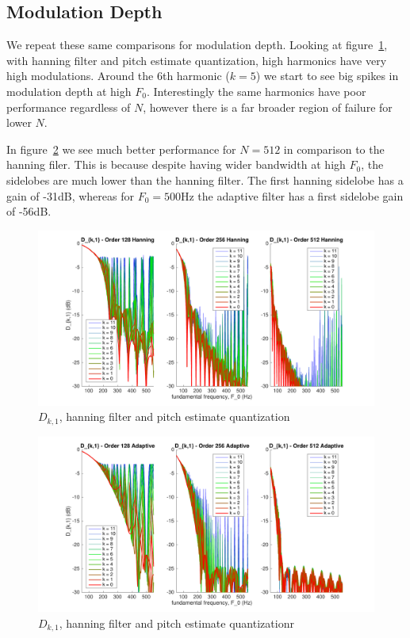 \documentclass [11pt, proquest,oneside] {uwthesis}[2015/03/03]
\begin{document}
\subsection{Modulation Depth}

We repeat these same comparisons for modulation depth.  Looking at figure~\ref{fig:pitch_d_ki_1}, with hanning filter and pitch estimate quantization, high harmonics have very high modulations.  Around the 6th harmonic ($k = 5$) we start to see big spikes in modulation depth at high $F_0$.  Interestingly the same harmonics have poor performance regardless of $N$, however there is a far broader region of failure for lower $N$.

In  figure~\ref{fig:pitch_d_ki_2} we see much better performance for $N = 512$ in comparison to the hanning filer.  This is because despite having wider bandwidth at high $F_0$, the sidelobes are much lower than the hanning filter.  The first hanning sidelobe has a gain of -31dB, whereas for $F_0 = 500$Hz the adaptive filter has a first sidelobe gain of -56dB.

\begin{figure}[!ht]
  \centering
    \includegraphics[width=1\textwidth]{pitch_d_ki_1}
    \caption{$D_{k,1}$, hanning filter and pitch estimate quantization}\label{fig:pitch_d_ki_1}
\end{figure}

\begin{figure}[!ht]
  \centering
    \includegraphics[width=1\textwidth]{pitch_d_ki_2}
    \caption{$D_{k,1}$, hanning filter and pitch estimate quantizationr}\label{fig:pitch_d_ki_2}
\end{figure}
\end{document}
